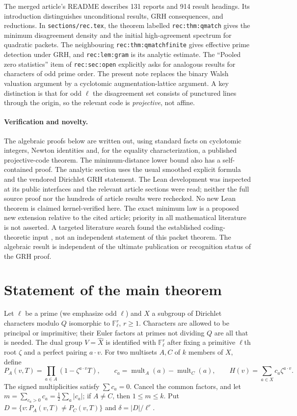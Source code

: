\documentclass[11pt]{article}
\theoremstyle{remark}\newtheorem{remark}[theorem]{Remark}
\newcommand{\F}{\mathbb F}
\newcommand{\abs}[1]{\lvert#1\rvert}
\begin{document}
The merged article's README describes 131 reports and 914 result headings. Its introduction distinguishes unconditional results, GRH consequences, and reductions. In \texttt{sections/rec.tex}, the theorem labelled \texttt{rec:thm:qmatch} gives the minimum disagreement density and the initial high-agreement spectrum for quadratic packets. The neighbouring \texttt{rec:thm:qmatchfinite} gives effective prime detection under GRH, and \texttt{rec:lem:gram} is its analytic estimate. The ``Pooled zero statistics'' item of \texttt{rec:sec:open} explicitly asks for analogous results for characters of odd prime order. The present note replaces the binary Walsh valuation argument by a cyclotomic augmentation-lattice argument. A key distinction is that for odd $\ell$ the disagreement set consists of punctured lines through the origin, so the relevant code is \emph{projective}, not affine.

\paragraph{Verification and novelty.} The algebraic proofs below are written out, using standard facts on cyclotomic integers, Newton identities and, for the equality characterization, a published projective-code theorem. The minimum-distance lower bound also has a self-contained proof. The analytic section uses the usual smoothed explicit formula and the vendored Dirichlet GRH statement. The Lean development was inspected at its public interfaces and the relevant article sections were read; neither the full source proof nor the hundreds of article results were rechecked. No new Lean theorem is claimed kernel-verified here. The exact minimum law is a proposed new extension relative to the cited article; priority in all mathematical literature is not asserted. A targeted literature search found the established coding-theoretic input \cite{GL,Sorensen}, not an independent statement of this packet theorem. The algebraic result is independent of the ultimate publication or recognition status of the GRH proof.

\section{Statement of the main theorem}
Let $\ell$ be a prime (we emphasize odd $\ell$) and $X$ a subgroup of Dirichlet characters modulo $Q$ isomorphic to $\F_\ell^r$, $r\ge1$. Characters are allowed to be principal or imprimitive; their Euler factors at primes not dividing $Q$ are all that is needed. The dual group $V=\widehat X$ is identified with $\F_\ell^r$ after fixing a primitive $\ell$th root $\zeta$ and a perfect pairing $a\cdot v$.
For two multisets $A,C$ of $k$ members of $X$, define
\[
 P_A(v,T)=\prod_{a\in A}(1-\zeta^{a\cdot v}T),\qquad
 c_a=\operatorname{mult}_A(a)-\operatorname{mult}_C(a),\qquad
 H(v)=\sum_{a\in X}c_a\zeta^{a\cdot v}.
\]
The signed multiplicities satisfy $\sum c_a=0$. Cancel the common factors, and let $m=\sum_{c_a>0}c_a=\frac12\sum_a\abs{c_a}$; if $A\ne C$, then $1\le m\le k$. Put $D=\{v:P_A(v,T)\ne P_C(v,T)\}$ and $\delta=\abs D/\ell^r$.
\end{document}
